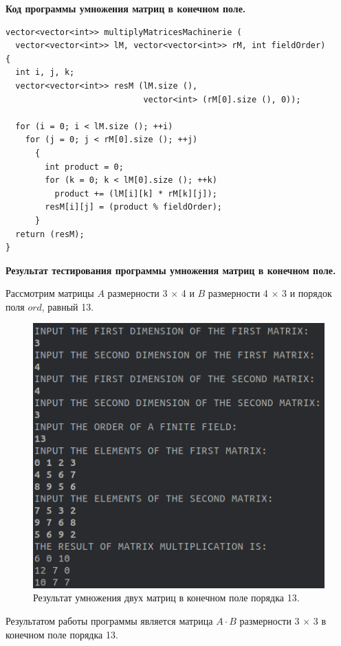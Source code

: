 \documentclass[spec, och, otchet, hidelinks]{SCWorks}
\newcommand{\tbf}[1]{\textbf{#1}}
\begin{document}
\par \tbf{Код программы умножения матриц в конечном поле.}
\begin{lstlisting}[caption=Код программы., mathescape]
vector<vector<int>> multiplyMatricesMachinerie (
  vector<vector<int>> lM, vector<vector<int>> rM, int fieldOrder)
{
  int i, j, k;
  vector<vector<int>> resM (lM.size (), 
                            vector<int> (rM[0].size (), 0));

  for (i = 0; i < lM.size (); ++i)
    for (j = 0; j < rM[0].size (); ++j)
      {
        int product = 0;
        for (k = 0; k < lM[0].size (); ++k)
          product += (lM[i][k] * rM[k][j]);
        resM[i][j] = (product % fieldOrder);
      }
  return (resM);
}
\end{lstlisting}

\par \tbf{Результат тестирования программы умножения матриц в конечном поле.}

\par Рассмотрим матрицы $A$ размерности 3 $\times$ 4 и $B$ размерности 4
$\times$ 3 и порядок поля $ord$, равный 13.

\begin{figure}[h]
  \center\includegraphics[scale=0.6]{matrix_field_multiplication.png}
  \caption{Результат умножения двух матриц в конечном поле порядка 13.}
\end{figure}

\par Результатом работы программы является матрица $A \cdot B$ размерности 3
$\times$ 3 в конечном поле порядка 13.
\end{document}
